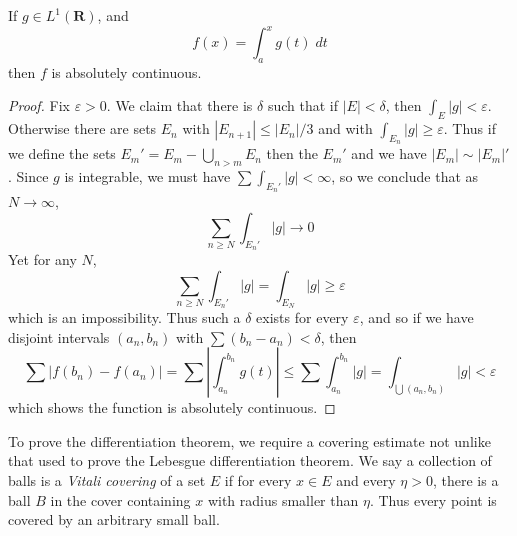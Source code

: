 \begin{theorem}
  If $g \in L^1(\mathbf{R})$, and
  \[ f(x) = \int_a^x g(t)\; dt \]
  then $f$ is absolutely continuous.
\end{theorem}
\begin{proof}
  Fix $\varepsilon > 0$. We claim that there is $\delta$ such that if $|E| < \delta$, then $\int_E |g| < \varepsilon$. Otherwise there are sets $E_n$ with $|E_{n+1}| \leq |E_n|/3$ and with $\int_{E_n} |g| \geq \varepsilon$. Thus if we define the sets $E_m' = E_m - \bigcup_{n > m} E_n$ then the $E_m'$ and we have $|E_m| \sim |E_m|'$. Since $g$ is integrable, we must have $\sum \int_{E_n'} |g| < \infty$, so we conclude that as $N \to \infty$,
  \[ \sum_{n \geq N} \int_{E_n'} |g| \to 0 \]
  Yet for any $N$,
  \[ \sum_{n \geq N} \int_{E_n'} |g| = \int_{E_N} |g| \geq \varepsilon \]
  which is an impossibility. Thus such a $\delta$ exists for every $\varepsilon$, and so if we have disjoint intervals $(a_n,b_n)$ with $\sum (b_n - a_n) < \delta$, then
  \[ \sum |f(b_n) - f(a_n)| = \sum \left| \int_{a_n}^{b_n} g(t) \right| \leq \sum \int_{a_n}^{b_n} |g| = \int_{\bigcup (a_n,b_n)} |g| < \varepsilon \]
  which shows the function is absolutely continuous.
\end{proof}

To prove the differentiation theorem, we require a covering estimate not unlike that used to prove the Lebesgue differentiation theorem. We say a collection of balls is a \emph{Vitali covering} of a set $E$ if for every $x \in E$ and every $\eta > 0$, there is a ball $B$ in the cover containing $x$ with radius smaller than $\eta$. Thus every point is covered by an arbitrary small ball.

